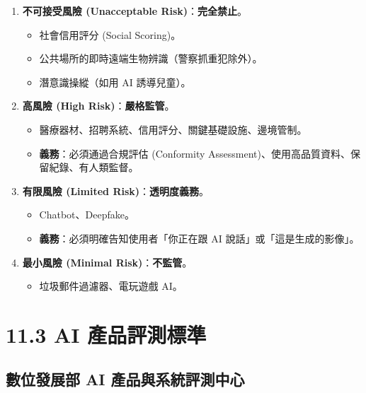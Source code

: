\documentclass[
  letterpaper,
  DIV=11,
  numbers=noendperiod]{scrreprt}
\providecommand{\tightlist}{%
  \setlength{\itemsep}{0pt}\setlength{\parskip}{0pt}}
\begin{document}
\begin{enumerate}
\def\labelenumi{\arabic{enumi}.}
\tightlist
\item
  \textbf{不可接受風險 (Unacceptable Risk)}：\textbf{完全禁止}。

  \begin{itemize}
  \tightlist
  \item
    社會信用評分 (Social Scoring)。
  \item
    公共場所的即時遠端生物辨識（警察抓重犯除外）。
  \item
    潛意識操縱（如用 AI 誘導兒童）。
  \end{itemize}
\item
  \textbf{高風險 (High Risk)}：\textbf{嚴格監管}。

  \begin{itemize}
  \tightlist
  \item
    醫療器材、招聘系統、信用評分、關鍵基礎設施、邊境管制。
  \item
    \textbf{義務}：必須通過合規評估 (Conformity
    Assessment)、使用高品質資料、保留紀錄、有人類監督。
  \end{itemize}
\item
  \textbf{有限風險 (Limited Risk)}：\textbf{透明度義務}。

  \begin{itemize}
  \tightlist
  \item
    Chatbot、Deepfake。
  \item
    \textbf{義務}：必須明確告知使用者「你正在跟 AI
    說話」或「這是生成的影像」。
  \end{itemize}
\item
  \textbf{最小風險 (Minimal Risk)}：\textbf{不監管}。

  \begin{itemize}
  \tightlist
  \item
    垃圾郵件過濾器、電玩遊戲 AI。
  \end{itemize}
\end{enumerate}

\chapter{11.3 AI 產品評測標準}\label{sec-ai-evaluation}

\section{數位發展部 AI 產品與系統評測中心}\label{sec-moda-eval}
\end{document}
